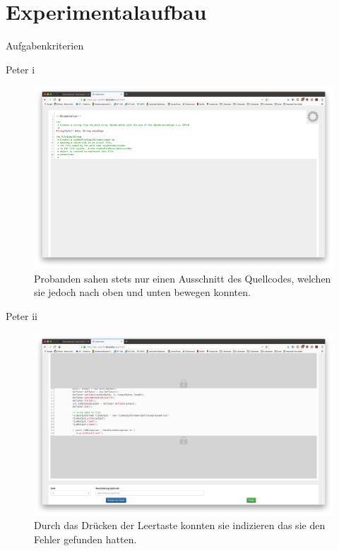 \documentclass[10pt]{beamer}
\begin{document}
\section{Experimentalaufbau}

	\begin{frame}{Aufgabenkriterien}

	\end{frame}

	\begin{frame}{Peter  i}
		\begin{figure}
			\includegraphics[scale=0.15]{graphics/peter_window.png}
			\caption{\label{fig:peter_window.png} Probanden sahen stets nur einen Ausschnitt des Quellcodes, welchen sie jedoch nach oben und unten bewegen konnten.}
		\end{figure}
	\end{frame}

	\begin{frame}{Peter  ii}	
		\begin{figure}
			\includegraphics[scale=0.15]{graphics/peter_correction.png}
			\caption{\label{fig:peter_correction.png} Durch das Drücken der Leertaste konnten sie indizieren das sie den Fehler gefunden hatten.}
		\end{figure}
	\end{frame}
\end{document}
